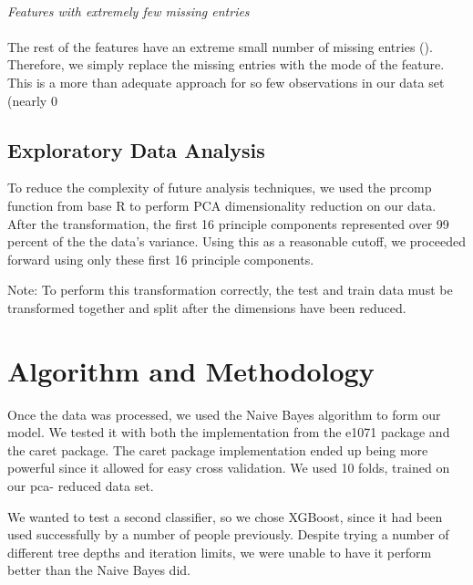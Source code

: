 \documentclass[fleqn,10pt]{SelfArx} %
\begin{document}
\\

\textit{Features with extremely few missing entries}\\
\\
The rest of the features have an extreme small number of missing entries (). Therefore, we simply replace the missing entries with the mode of the feature. This is a more than adequate approach for so few observations in our data set (nearly 0%

\subsection{Exploratory Data Analysis}

To reduce the complexity of future analysis techniques, we used the prcomp function from base R to perform PCA dimensionality reduction on our data. After the transformation, the first 16 principle components represented over 99 percent of the the data's variance. Using this as a reasonable cutoff, we proceeded forward using only these first 16 principle components.

Note: To perform this transformation correctly, the test and train data must be transformed together and split after the dimensions have been reduced.
\bigskip
\bigskip


\section{Algorithm and Methodology}

Once the data was processed, we used the Naive Bayes algorithm to form our model. We tested it with both the implementation from the e1071 package and the caret package. The caret package implementation ended up being more powerful since it allowed for easy cross validation. We used 10 folds, trained on our pca- reduced data set. 

We wanted to test a second classifier, so we chose XGBoost, since it had been used successfully by a number of people previously. Despite trying a number of different tree depths and iteration limits, we were unable to have it perform better than the Naive Bayes did. 


\bigskip
\bigskip
\end{document}
